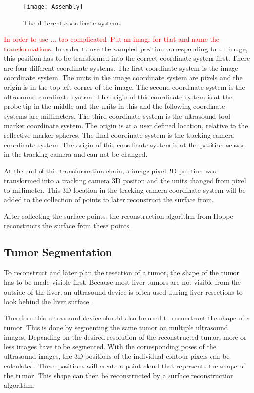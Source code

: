 \begin{figure}[H]
  \centering
  \texttt{[image: Assembly]}
  \caption{The different coordinate systems}
  \label{fig:Assembly}
\end{figure}

\textcolor{red}{In order to use ... too complicated. Put an image for that and name the transformations.}
In order to use the sampled position corresponding to an image, this
position has to be transformed into the correct coordinate system first. There
are four different coordinate systems. The first coordinate system is the image
coordinate system. The units in the image coordinate system are pixels and the
origin is in the top left corner of the image. The
second coordinate system is the ultrasound coordinate system. The origin of this
coordinate system is at the probe tip in the middle and the units in this and
the following coordinate systems are millimeters. The third coordinate system is the
ultrasound-tool-marker coordinate system. The origin is at a user defined
location, relative to the reflective marker spheres. The final
coordinate system is the tracking camera coordinate system. The origin of this
coordinate system is at the position sensor in the tracking camera and can not
be changed.

At the end of this transformation chain, a image pixel 2D position was
transformed into a tracking camera 3D positon and the units changed
from pixel to millimeter. This 3D location in the tracking camera coordinate system
will be added to the collection of points to later reconstruct the surface from.

After collecting the surface points, the reconstruction algorithm from Hoppe
\cite{hoppe1992surface} reconstructs the surface from these points.
\subsection{Tumor Segmentation}
To reconstruct and later plan the resection of a tumor, the shape
of the tumor has to be made visible first. Because most liver tumors are not visible from the outside of the liver, an
ultrasound device is often used during liver resections to look behind the
liver surface.

Therefore this ultrasound device should also be used to
reconstruct the shape of a tumor. This is done by segmenting the same tumor on
multiple ultrasound images. Depending on the desired resolution of the
reconstructed tumor, more or less images have to be segmented. With the corresponding
poses of the ultrasound images, the 3D positions of the individual contour
pixels can be calculated. These positions will create a point cloud that
represents the shape of the tumor. This shape can then be reconstructed by a
surface reconstruction algorithm.
